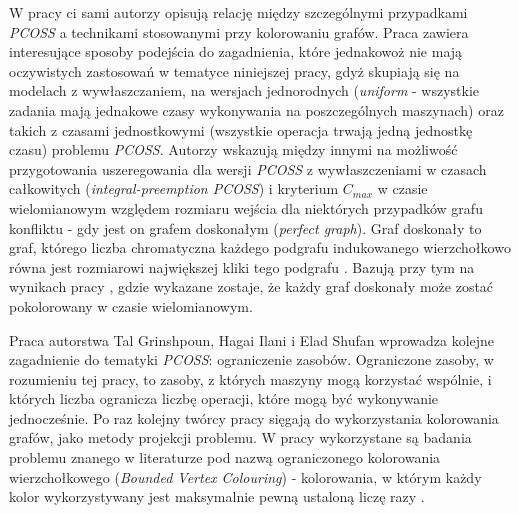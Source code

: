 \documentclass[brudnopis]{xmgr}
\begin{document}
W pracy \cite{ilani2016partially} ci sami autorzy opisują relację między szczególnymi przypadkami \emph{PCOSS} a technikami stosowanymi przy kolorowaniu grafów. Praca zawiera interesujące sposoby podejścia do zagadnienia, które jednakowoż nie mają oczywistych zastosowań w tematyce niniejszej pracy, gdyż skupiają się na modelach z wywłaszczaniem, na wersjach jednorodnych (\emph{uniform} - wszystkie zadania mają jednakowe czasy wykonywania na poszczególnych maszynach) oraz takich z czasami jednostkowymi (wszystkie operacja trwają jedną jednostkę czasu) problemu \emph{PCOSS}. Autorzy wskazują między innymi na możliwość przygotowania uszeregowania dla wersji \emph{PCOSS} z wywłaszczeniami w czasach całkowitych (\emph{integral-preemption PCOSS}) i kryterium $C_{max}$ w czasie wielomianowym względem rozmiaru wejścia dla niektórych przypadków grafu konfliktu - gdy jest on grafem doskonałym (\emph{perfect graph}). Graf doskonały to graf, którego liczba chromatyczna każdego podgrafu indukowanego wierzchołkowo równa jest rozmiarowi największej kliki tego podgrafu \cite{diestel2010graph}. Bazują przy tym na wynikach pracy \cite{grotschel1984polynomial}, gdzie wykazane zostaje, że każdy graf doskonały może zostać pokolorowany w czasie wielomianowym.
\medskip

Praca \cite{ilani2018partially} autorstwa Tal Grinshpoun, Hagai Ilani i Elad Shufan wprowadza kolejne zagadnienie do tematyki \emph{PCOSS}: ograniczenie zasobów. Ograniczone zasoby, w rozumieniu tej pracy, to zasoby, z których maszyny mogą korzystać wspólnie, i których liczba ogranicza liczbę operacji, które mogą być wykonywanie jednocześnie. Po raz kolejny twórcy pracy sięgają do wykorzystania kolorowania grafów, jako metody projekcji problemu. W pracy wykorzystane są badania problemu znanego w literaturze pod nazwą ograniczonego kolorowania wierzchołkowego (\emph{Bounded Vertex Colouring}) - kolorowania, w którym każdy kolor wykorzystywany jest maksymalnie pewną ustaloną liczę razy \cite{hansen1993bounded}.



\end{document}
